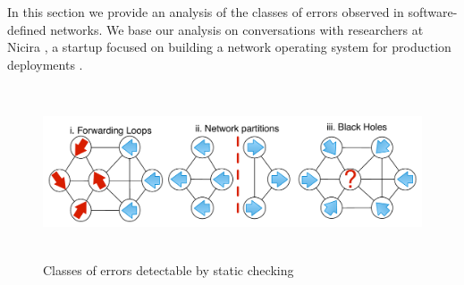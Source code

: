 
In this section we provide an analysis of the classes of errors observed in
software-defined networks. We base our analysis on conversations with
researchers at Nicira \cite{Nicira}, a startup focused on building a network operating
system for production deployments \cite{Onix}.

\begin{figure}[t]
    \centering
    \includegraphics[height=2in,width=6in]{../diagrams/bugs/basic_invariants.pdf}
    \caption[]{\label{fig:loop} Classes of errors detectable by static
    checking\vspace{-10pt}} 
\end{figure}

